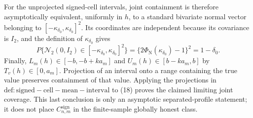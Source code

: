 For the unprojected signed-cell intervals, joint containment is therefore asymptotically equivalent, uniformly in \(h\), to a standard bivariate normal vector belonging to \([-\kappa_{\delta_0},\kappa_{\delta_0}]^2\). Its coordinates are independent because its covariance is \(I_2\), and the definition of \(\kappa_{\delta_0}\) gives
\[
 P\{\mathcal N_2(0,I_2)\in[-\kappa_{\delta_0},\kappa_{\delta_0}]^2\}
 =\{2\Phi_{\mathrm N}(\kappa_{\delta_0})-1\}^2=1-\delta_0.             \tag{18}
\]
Finally, \(L_m(h)\in[-b,-b+ka_m]\) and \(U_m(h)\in[b-ka_m,b]\) by \(T_v(h)\in[0,a_m]\). Projection of an interval onto a range containing the true value preserves containment of that value. Applying the projections in \(\mathrm{def:signed-cell-mean-interval}\) to (18) proves the claimed limiting joint coverage. This last conclusion is only an asymptotic separated-profile statement; it does not place \(C^{\mathrm{sign}}_{n,m}\) in the finite-sample globally honest class.
